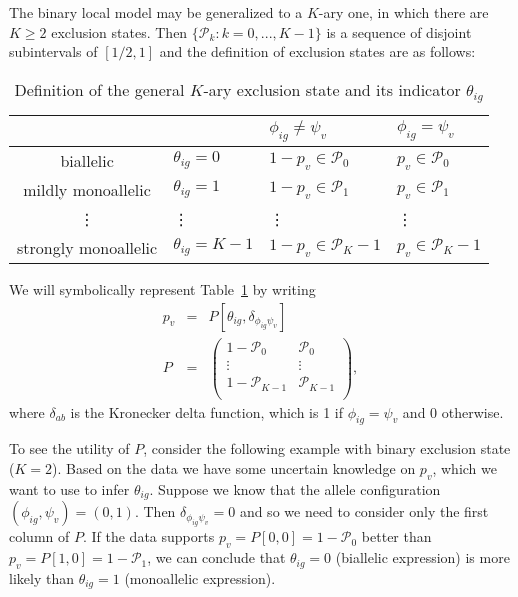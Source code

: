 \documentclass[letterpaper]{article}
\begin{document}
The binary local model may be generalized to a \(K\)-ary one, in which there
are \(K\ge 2\) exclusion states.  Then \(\{\mathcal{P}_k: k=0,...,K-1\}\) is a
sequence of disjoint subintervals of \([1/2,1]\) and
the definition of exclusion
states are as follows:
\begin{table}[h]
\begin{center}
\begin{tabular}{cl|ll|}
& & \(\phi_{ig}\neq\psi_v\) & \(\phi_{ig}=\psi_v\) \\
\hline
biallelic & \(\theta_{ig}=0\) & \(1-p_v \in \mathcal{P}_0\) & \(p_v \in \mathcal{P}_0\) \\
mildly monoallelic & \(\theta_{ig}=1\) & \(1-p_v \in \mathcal{P}_1\) & \(p_v \in \mathcal{P}_1\) \\
\vdots & \vdots & \vdots & \vdots \\
strongly monoallelic & \(\theta_{ig}=K-1\) & \(1-p_v \in \mathcal{P}_K-1\) & \(p_v \in \mathcal{P}_K-1\) \\
\hline
\end{tabular}
\caption{
Definition of the general \(K\)-ary exclusion state and its indicator \(\theta_{ig}\)
}
\label{tab:def-exclusion-state-multi}
\end{center}
\end{table}

We will symbolically represent Table~\ref{tab:def-exclusion-state-multi} by writing
\begin{eqnarray}
\label{eq:p-v-by-P-matrix}
p_v &=& P[\theta_{ig},\delta_{\phi_{ig}\psi_v}] \\
\label{eq:P-matrix}
P &=&
\begin{pmatrix}
1-\mathcal{P}_0 & \mathcal{P}_0 \\
\vdots & \vdots \\
1-\mathcal{P}_{K-1} & \mathcal{P}_{K-1} \\
\end{pmatrix},
\end{eqnarray}
where \(\delta_{ab}\) is
the Kronecker delta function, which is 1 if \(\phi_{ig}=\psi_v\) and 0
otherwise.

To see the utility of \(P\), consider the following example with binary
exclusion state (\(K=2\)).  Based on the data we have some uncertain
knowledge on \(p_v\), which we want to use to infer \(\theta_{ig}\).  Suppose
we know that the allele configuration \((\phi_{ig},\psi_v)=(0,1)\).  Then
\(\delta_{\phi_{ig}\psi_v}=0\) and so we need to consider only the first
column of \(P\).  If the data supports \(p_v = P[0,0] = 1-\mathcal{P}_0\)
better than \(p_v = P[1,0] = 1-\mathcal{P}_1\), we can conclude that
\(\theta_{ig}=0\) (biallelic expression) is more likely than \(\theta_{ig}=1\)
(monoallelic expression).
\end{document}
